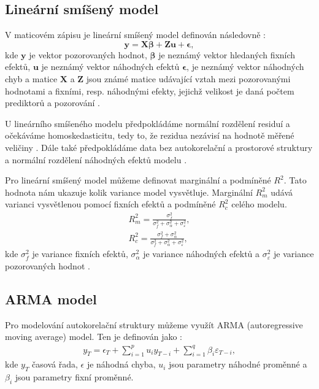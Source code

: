 \subsection{Lineární smíšený model}\label{chap:lme}
V maticovém zápisu je lineární smíšený model definován následovně \parencite{mcleanrobert1991}:
$$\boldsymbol{y} = \boldsymbol{X}\boldsymbol{\beta} + \boldsymbol{Z}\boldsymbol{u} + \boldsymbol{\epsilon},$$ \label{eq:linearmixedeffectmodel}
kde $\mathbf{y}$ je vektor pozorovaných hodnot, $\mathbf{\beta}$ je neznámý vektor hledaných fixních efektů, $\mathbf{u}$ je neznámý vektor náhodných efektů $\mathbf{\epsilon}$, je neznámý vektor náhodných chyb a matice $\mathbf{X}$ a $\mathbf{Z}$ jsou známé matice udávající vztah mezi pozorovanými hodnotami a fixními, resp. náhodnými efekty, jejichž velikost je daná počtem prediktorů a pozorování \parencite{mcleanrobert1991}.

U lineárního smíšeného modelu předpokládáme normální rozdělení residuí a očekáváme homoskedasticitu, tedy to, že rezidua nezávisí na hodnotě měřené veličiny \parencite{homoscedasticity}. Dále také předpokládáme data bez autokorelační a prostorové struktury a normální rozdělení náhodných efektů modelu \parencite{hefleytrevorj2017}. 

Pro lineární smíšený model můžeme definovat marginální a podmíněné $R^2$. Tato hodnota nám ukazuje kolik variance model vysvětluje. Marginální $R_m^2$ udává varianci vysvětlenou pomocí fixních efektů a podmíněné $R_c^2$ celého modelu.
\begin{gather}
	R_m^2 = \frac{\sigma_f^2}{\sigma_f^2+\sigma_{\alpha}^2+\sigma_{\varepsilon}^2},\\
	R_c^2 = \frac{\sigma_f^2+\sigma_{\alpha}^2}{\sigma_f^2+\sigma_{\alpha}^2+\sigma_{\varepsilon}^2},
\end{gather}
kde $\sigma_f^2$ je variance fixních efektů, $\sigma_{\alpha}^2$ je variance náhodných efektů a $\sigma_{\varepsilon}^2$ je variance pozorovaných hodnot \parencite{lmersquared}.

\subsection{ARMA model}
Pro modelování autokorelační struktury můžeme využít ARMA (autoregressive moving average) model. Ten je definován jako \parencite{wilsongranville2016}:
\begin{gather*}
y_T = \epsilon_T + \sum_{i=1}^{p}u_i y_{T-i} + \sum_{i=1}^{q}\beta_i\varepsilon_{T-i},
\end{gather*}
kde $y_T$ časová řada, $\epsilon$ je náhodná chyba, $u_i$ jsou parametry náhodné proměnné a $\beta_i$ jsou parametry fixní proměnné. 

